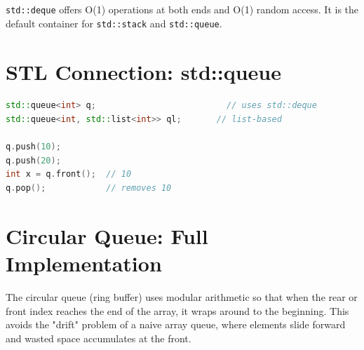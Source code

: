 \texttt{std::deque} offers O(1) operations at both ends and O(1) random access. It is the default container for \texttt{std::stack} and \texttt{std::queue}.

\section{STL Connection: std::queue}

\begin{lstlisting}[language=C++]
std::queue<int> q;                          // uses std::deque
std::queue<int, std::list<int>> ql;       // list-based

q.push(10);
q.push(20);
int x = q.front();  // 10
q.pop();            // removes 10
\end{lstlisting}

\section{Circular Queue: Full Implementation}

The circular queue (ring buffer) uses modular arithmetic so that when the rear or front index reaches the end of the array, it wraps around to the beginning. This avoids the "drift" problem of a naive array queue, where elements slide forward and wasted space accumulates at the front.

